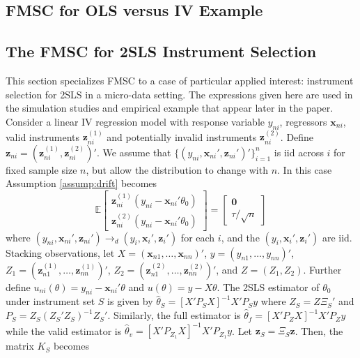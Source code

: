 \documentclass[12pt]{article}
\newcommand{\expect}{\mathbb{E}}
\theoremstyle{definition}
\begin{document}
\subsection{FMSC for OLS versus IV Example}

\subsection{The FMSC for 2SLS Instrument Selection}\label{sec:2sls}
This section specializes FMSC to a case of particular applied interest: instrument selection for 2SLS in a micro-data setting. The expressions given here are used in the simulation studies and empirical example that appear later in the paper. Consider a linear IV regression model with response variable $y_{ni}$, regressors $\mathbf{x}_{ni}$, valid instruments $\mathbf{z}^{(1)}_{ni}$ and potentially invalid instruments $\mathbf{z}^{(2)}_{ni}$. Define $\mathbf{z}_{ni} = (\mathbf{z}^{(1)}_{ni},\mathbf{z}^{(2)}_{ni})'$. We assume that $\{(y_{ni}, \mathbf{x}_{ni}',\mathbf{z}_{ni}')'\}_{i=1}^n$ is iid across $i$ for fixed sample size $n$, but allow the distribution to change with $n$.
In this case Assumption \ref{assump:drift} becomes
\begin{equation}
\label{eq:linear}
	\expect\left[\begin{array}{c} \mathbf{z}^{(1)}_{ni} \left(y_{ni} - \mathbf{x}_{ni}' \theta_0  \right)  \\ \mathbf{z}^{(2)}_{ni} \left(y_{ni} - \mathbf{x}_{ni}' \theta_0  \right) \end{array}  \right] = \left[\begin{array}{c} \mathbf{0}\\ \tau/\sqrt{n}  \end{array}\right]
\end{equation}
where $(y_{ni},\mathbf{x}_{ni}',\mathbf{z}_{ni}')\rightarrow_d(y_i,\mathbf{x}_{i}',\mathbf{z}_{i}')$ for each $i$, and the $(y_i,\mathbf{x}_{i}',\mathbf{z}_{i}')$ are iid. Stacking observations, let $X = \left(\mathbf{x}_{n1}, \hdots, \mathbf{x}_{nn} \right)'$, $y = \left( y_{n1}, \hdots, y_{nn}\right)'$, $Z_1 = (\mathbf{z}^{(1)}_{n1}, \hdots, \mathbf{z}^{(1)}_{nn} )'$, $Z_2 = (\mathbf{z}^{(2)}_{n1}, \hdots, \mathbf{z}^{(2)}_{nn})'$, and $Z = (Z_1, Z_2)$. Further define $u_{ni}(\theta) = y_{ni} - \mathbf{x}_{ni}'\theta$ and $u(\theta) = y - X\theta$. The 2SLS estimator of $\theta_0$ under instrument set $S$ is given by $\widehat{\theta}_{S} = \left[X'P_SX\right]^{-1} X'P_S y$ where $Z_S = Z\Xi_S'$ and $P_S = Z_S(Z_S'Z_S)^{-1}Z_S'$. Similarly, the full estimator is $\widehat{\theta}_{f} = \left[X' P_Z X\right]^{-1} X' P_Z y$ while the valid estimator is $\widehat{\theta}_{v} = \left[X' P_{Z_1} X\right]^{-1} X' P_{Z_1}y$. Let $\mathbf{z}_S = \Xi_S \mathbf{z}$. Then, the matrix $K_S$ becomes
\end{document}
